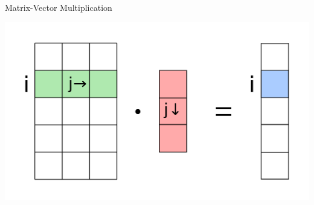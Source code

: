 \documentclass{beamer}
\begin{document}
\begin{frame}{Matrix-Vector Multiplication}
  \begin{center}
    \includegraphics[width=\textwidth, height=\textheight, keepaspectratio]{mvm.png}
  \end{center}
  \end{frame}
\end{document}
